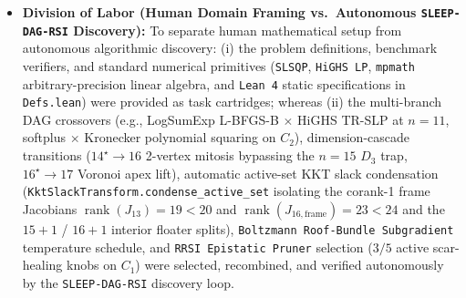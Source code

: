 \documentclass[11pt,a4paper]{article}
\begin{document}
\begin{itemize}
\item \textbf{Division of Labor (Human Domain Framing vs.\ Autonomous \texttt{SLEEP-DAG-RSI} Discovery):} To separate human mathematical setup from autonomous algorithmic discovery: (i) the problem definitions, benchmark verifiers, and standard numerical primitives (\texttt{SLSQP}, \texttt{HiGHS LP}, \texttt{mpmath} arbitrary-precision linear algebra, and \texttt{Lean 4} static specifications in \texttt{Defs.lean}) were provided as task cartridges; whereas (ii) the multi-branch DAG crossovers (e.g., LogSumExp L-BFGS-B $\times$ HiGHS TR-SLP at $n=11$, softplus $\times$ Kronecker polynomial squaring on $C_2$), dimension-cascade transitions ($14^\star \to 16$ 2-vertex mitosis bypassing the $n=15$ $D_3$ trap, $16^\star \to 17$ Voronoi apex lift), automatic active-set KKT slack condensation (\texttt{KktSlackTransform.condense\_active\_set} isolating the corank-1 frame Jacobians $\operatorname{rank}(J_{13})=19<20$ and $\operatorname{rank}(J_{16,\text{frame}})=23<24$ and the $15+1$ / $16+1$ interior floater splits), \texttt{Boltzmann Roof-Bundle Subgradient} temperature schedule, and \texttt{RRSI Epistatic Pruner} selection ($3/5$ active scar-healing knobs on $C_1$) were selected, recombined, and verified autonomously by the \texttt{SLEEP-DAG-RSI} discovery loop.
\end{itemize}
\end{document}
